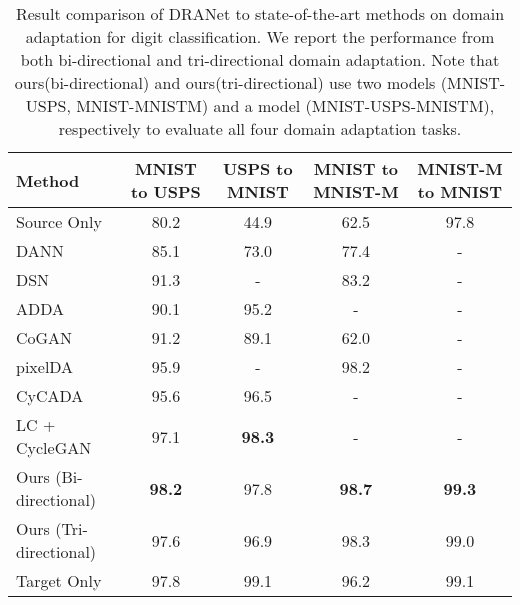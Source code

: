 \documentclass[final]{cvpr}
\begin{document}
\begin{table*}[t]
\begin{center}
\small
\begin{tabular}{lcccc}
\hline
\textbf{Method} & \textbf{MNIST to USPS} & \textbf{USPS to MNIST} & \textbf{MNIST to MNIST-M} & \textbf{MNIST-M to MNIST}  \\
\hline
Source Only~ & 80.2 & 44.9 & 62.5 & 97.8 \\
DANN~\cite{ganin2016domain} & 85.1 & 73.0 & 77.4 & -  \\
DSN~\cite{bousmalis2016domain} & 91.3 & - & 83.2 & -  \\
ADDA~\cite{tzeng2017adversarial} & 90.1 & 95.2 & - & -  \\
CoGAN~\cite{liu2016coupled} & 91.2 & 89.1 & 62.0 & -  \\
pixelDA~\cite{bousmalis2017unsupervised} & 95.9 & - & 98.2 & -  \\
CyCADA~\cite{hoffman2018cycada} & 95.6 & 96.5 & - & -  \\
LC + CycleGAN~\cite{ye2020light, zhu2017unpaired} & 97.1 & \textbf{98.3} & - & - \\
\hline
Ours (Bi-directional) & \textbf{98.2} & 97.8 & \textbf{98.7} & \textbf{99.3} \\
Ours (Tri-directional) & 97.6 & 96.9 & 98.3 & 99.0 \\
\hline
Target Only~ & 97.8 & 99.1 & 96.2 & 99.1 \\
\hline
\end{tabular}
\end{center}
\caption{Result comparison of DRANet to state-of-the-art methods on domain adaptation for digit classification. We report the performance from both bi-directional and tri-directional domain adaptation. Note that ours(bi-directional) and ours(tri-directional) use two models (MNIST-USPS, MNIST-MNISTM) and a model (MNIST-USPS-MNISTM), respectively to evaluate all four domain adaptation tasks.}
\label{tab:digit}
\end{table*}
\end{document}
